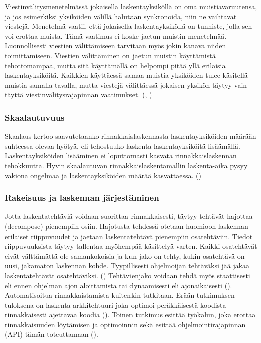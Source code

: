 Viestinvälitysmenetelmässä jokaisella
laskentayksiköllä on oma muistiavaruutensa, ja jos esimerkiksi  yksiköiden
välillä halutaan synkronoida, niin ne vaihtavat viestejä. Menetelmä vaatii,
että jokaisella laskentayksiköllä on tunniste, jolla sen voi erottaa muista.
Tämä vaatimus ei koske jaetun muistin menetelmää. Luonnollisesti viestien
välittämiseen tarvitaan myös jokin kanava niiden toimittamiseen. Viestien
välittäminen on jaetun muistin käyttämistä tehottomampaa, mutta sitä
käyttämällä on helpompi pitää yllä erilaisia laskentayksiköitä. Kaikkien
käyttäessä samaa muistia yksiköiden tulee käsitellä muistia samalla tavalla,
mutta viestejä välittäessä jokaisen yksikön täytyy vain täyttä
viestinvälitysrajapinnan vaatimukset. (\citealt{intro}, \citealt{rauber})

\subsubsection{Skaalautuvuus}

Skaalaus kertoo saavutetaanko rinnakkaislaskennasta laskentayksiköiden määrään
suhteessa olevaa hyötyä, eli tehostuuko laskenta laskentayksiköitä lisäämällä.
Laskentayksiköiden lisääminen ei loputtomasti kasvata rinnakkaislaskennan
tehokkuutta. Hyvin skaalautuvan rinnakkaislaskentamallin laskenta-aika pysyy
vakiona ongelmaa ja laskentayksiköiden määrää kasvattaessa. (\citealt{rauber})

\subsubsection{Rakeisuus ja laskennan järjestäminen}

Jotta laskentatehtäviä voidaan suorittaa rinnakkaisesti, täytyy tehtävät
hajottaa (decompose) pienempiin osiin. Hajotusta tehdessä otetaan huomioon laskennan
erilaiset riippuvuudet ja jaetaan laskentatehtävä pienempiin osatehtäviin.
Tiedot riippuvuuksista täytyy tallentaa myöhempää käsittelyä varten.
Kaikki osatehtävät eivät välttämättä ole samankokoisia ja kun jako on tehty,
kukin osatehtävä on uusi, jakamaton laskennan kohde. Tyypillisesti ohjelmoijan
tehtäväksi jää jakaa laskentatehtävät osatehtäviksi. (\citealt{intro})
Tehtävienjako voidaan tehdä myös staattisesti eli ennen ohjelman ajon
aloittamista tai dynaamisesti eli ajonaikaisesti (\citealt{rauber}).
Automatisoitua rinnakkaistamista kuitenkin tutkitaan. Erään tutkimuksen
tuloksena on laskenta-arkkitehtuuri joka optimoi peräkkäisestä koodista
rinnakkaisesti ajettavaa koodia (\citealt{apopei}). Toinen tutkimus esittää
työkalun, joka erottaa rinnakkaisuuden löytämisen ja optimoinnin sekä esittää
ohjelmointirajapinnan (API) tämän toteuttamaan (\citealt{dope}).


